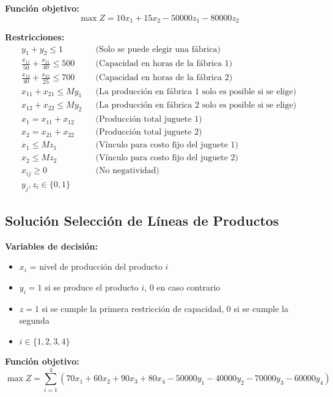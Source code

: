 \documentclass[12pt]{article}
\begin{document}
\textbf{Función objetivo:}
$$\max Z = 10x_1 + 15x_2 - 50000z_1 - 80000z_2$$

\textbf{Restricciones:}
\begin{align*}
    y_1 + y_2 \leq 1 && \text{(Solo se puede elegir una fábrica)} \\
    \frac{x_{11}}{50} + \frac{x_{21}}{40} \leq 500 && \text{(Capacidad en horas de la fábrica 1)} \\
    \frac{x_{12}}{40} + \frac{x_{22}}{25} \leq 700 && \text{(Capacidad en horas de la fábrica 2)} \\
    x_{11} + x_{21} \leq M y_1 && \text{(La producción en fábrica 1 solo es posible si se elige)} \\
    x_{12} + x_{22} \leq M y_2 && \text{(La producción en fábrica 2 solo es posible si se elige)} \\
    x_1 = x_{11} + x_{12} && \text{(Producción total juguete 1)} \\
    x_2 = x_{21} + x_{22} && \text{(Producción total juguete 2)} \\
    x_1 \leq M z_1 && \text{(Vínculo para costo fijo del juguete 1)} \\
    x_2 \leq M z_2 && \text{(Vínculo para costo fijo del juguete 2)} \\
    x_{ij} \geq 0 && \text{(No negatividad)} \\
    y_j, z_i \in \{0,1\} &&
\end{align*}

\subsection{Solución Selección de Líneas de Productos}

\textbf{Variables de decisión:}
\begin{itemize}
    \item $x_i$ = nivel de producción del producto $i$
    \item $y_i = 1$ si se produce el producto $i$, 0 en caso contrario
    \item $z = 1$ si se cumple la primera restricción de capacidad, 0 si se cumple la segunda
    \item $i \in \{1, 2, 3, 4\}$
\end{itemize}

\textbf{Función objetivo:}
$$\max Z = \sum_{i=1}^{4} (70x_1 + 60x_2 + 90x_3 + 80x_4 - 50000y_1 - 40000y_2 - 70000y_3 - 60000y_4)$$
\end{document}
